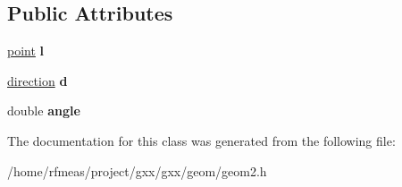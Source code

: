 \subsection*{Public Attributes}
\begin{DoxyCompactItemize}
\item 
\hyperlink{classmalgo_1_1vector2}{point} {\bfseries l}\hypertarget{classgxx_1_1geom2_1_1line_ac5521fe112a13c6b7d5268b420819aaf}{}\label{classgxx_1_1geom2_1_1line_ac5521fe112a13c6b7d5268b420819aaf}

\item 
\hyperlink{classmalgo_1_1unit__vector2}{direction} {\bfseries d}\hypertarget{classgxx_1_1geom2_1_1line_a468d9186da9ce6863980f530fb77bed5}{}\label{classgxx_1_1geom2_1_1line_a468d9186da9ce6863980f530fb77bed5}

\item 
double {\bfseries angle}\hypertarget{classgxx_1_1geom2_1_1line_af16b626b85c09cd7c458159b615d46d8}{}\label{classgxx_1_1geom2_1_1line_af16b626b85c09cd7c458159b615d46d8}

\end{DoxyCompactItemize}


The documentation for this class was generated from the following file\+:\begin{DoxyCompactItemize}
\item 
/home/rfmeas/project/gxx/gxx/geom/geom2.\+h\end{DoxyCompactItemize}

